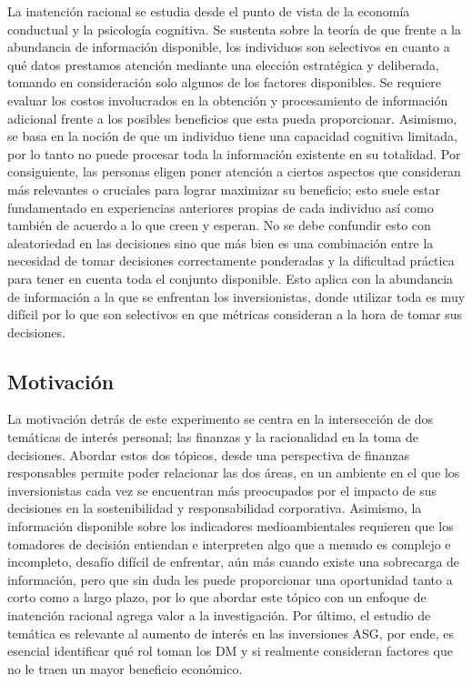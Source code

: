 La inatención racional se estudia desde el punto de vista de la economía conductual y la psicología cognitiva. Se sustenta sobre la teoría de que frente a la abundancia de información disponible, los individuos son selectivos en cuanto a qué datos prestamos atención mediante una elección estratégica y deliberada, tomando en consideración solo algunos de los factores disponibles. Se requiere evaluar los costos involucrados en la obtención y procesamiento de información adicional frente a los posibles beneficios que esta pueda proporcionar. Asimismo, se basa en la noción de que un individuo tiene una capacidad cognitiva limitada, por lo tanto no puede procesar toda la información existente en su totalidad. Por consiguiente, las personas eligen poner atención a ciertos aspectos que consideran más relevantes o cruciales para lograr maximizar su beneficio; esto suele estar fundamentado en experiencias anteriores propias de cada individuo así como también de acuerdo a lo que creen y esperan. No se debe confundir esto con aleatoriedad en las decisiones sino que más bien es una combinación entre la necesidad de tomar decisiones correctamente ponderadas y la dificultad práctica para tener en cuenta toda el conjunto disponible. Esto aplica con la abundancia de información a la que se enfrentan los inversionistas, donde utilizar toda es muy difícil por lo que son selectivos en que métricas consideran a la hora de tomar sus decisiones.


\subsection{Motivación}
La motivación detrás de este experimento se centra en la intersección de dos temáticas de interés personal; las finanzas y la racionalidad en la toma de decisiones. Abordar estos dos tópicos, desde una perspectiva de finanzas responsables permite poder relacionar las dos áreas, en un ambiente en el que los inversionistas cada vez se encuentran más preocupados por el impacto de sus decisiones en la sostenibilidad y responsabilidad corporativa.
Asimismo, la información disponible sobre los indicadores medioambientales requieren que los tomadores de decisión entiendan e interpreten algo que a menudo es complejo e incompleto, desafío difícil de enfrentar, aún más cuando existe una sobrecarga de información, pero que sin duda les puede proporcionar una oportunidad tanto a corto como a largo plazo, por lo que abordar este tópico con un enfoque de inatención racional agrega valor a la investigación.
Por último, el estudio de temática es relevante al aumento de interés en las inversiones ASG, por ende, es esencial identificar qué rol toman los DM y si realmente consideran factores que no le traen un mayor beneficio económico.


